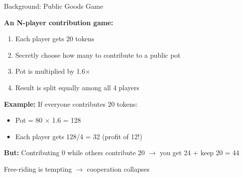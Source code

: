 \documentclass[aspectratio=169]{beamer}
\begin{document}

\begin{frame}{Background: Public Goods Game}
  
  \textbf{An N-player contribution game:}
  
  \vspace{1em}
  \begin{enumerate}
    \item Each player gets 20 tokens
    \item Secretly choose how many to contribute to a public pot
    \item Pot is multiplied by 1.6$\times$
    \item Result is split equally among all 4 players
  \end{enumerate}
  
  \vspace{1em}
  \textbf{Example:} If everyone contributes 20 tokens:
  \begin{itemize}
    \item Pot = 80 $\times$ 1.6 = 128
    \item Each player gets 128/4 = 32 (profit of 12!)
  \end{itemize}
  
  \vspace{0.5em}
  \textbf{But:} Contributing 0 while others contribute 20 $\to$ you get 24 + keep 20 = 44
  
  \vspace{0.5em}
  Free-riding is tempting $\to$ cooperation collapses

\end{frame}

\end{document}
